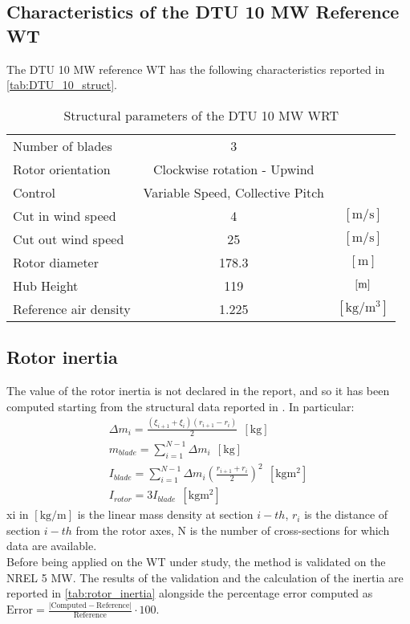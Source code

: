 \subsection{Characteristics of the DTU 10 MW Reference WT}
The DTU 10 MW reference WT has the following characteristics reported in \autoref{tab:DTU_10_struct}.
\begin{table}[htb]
    \caption{Structural parameters of the DTU 10 MW \acrshort{WRT}}
    \centering
    \begin{tabular}{lcc}
    \toprule
    Number of blades & 3 & \\
    Rotor orientation & Clockwise rotation - Upwind & \\
    Control & Variable Speed, Collective Pitch & \\
    Cut in wind speed & 4 & $\left[\si{\meter \per \second}\right]$ \\
    Cut out wind speed & 25 & $\left[\si{\meter \per \second}\right]$ \\
    Rotor diameter & 178.3 & $\left[\si{\meter}\right]$\\
    Hub Height & 119 & $\left[\si{\meter}\right]$\\
    Reference air density & 1.225 & $\left[\si{\kilo\gram\per\cubic\meter}\right]$\\
    \bottomrule
    \end{tabular}
    \label{tab:DTU_10_struct}
\end{table}

\subsection{Rotor inertia}
The value of the rotor inertia is not declared in the report, and so it has been computed starting from the structural data reported in \cite{DTU_Wind_Energy_Report-I-0092}. In particular:
\begin{gather}
    \Delta m_i=\frac{\left(\xi_{i+1} + \xi_i\right)\left(r_{i+1} - r_i\right)}{2} \ \ \left[\si{\kilo\gram}\right] \\
    m_{blade} = \sum_{i=1}^{N-1}\Delta m_i \ \ \left[\si{\kilo\gram}\right]\\
    I_{blade}=\sum_{i=1}^{N-1}\Delta m_i\left(\frac{r_{i+1} + r_i}{2}\right)^2 \ \ \left[\si{\kilo\gram\square\meter}\right]\\
    I_{rotor}=3I_{blade} \ \ \left[\si{\kilo\gram\square\meter}\right]
\end{gather}
\acrshort{xi} in $ \left[\si{\kilo\gram\per\meter}\right]$ is the linear mass density at section $i-th$, $r_i$ is the distance of section $i-th$ from the rotor axes, \acrshort{N} is the number of cross-sections for which data are available.\\
Before being applied on the \acrshort{WT} under study, the method is validated on the NREL 5 MW. The results of the validation and the calculation of the inertia are reported in \autoref{tab:rotor_inertia} alongside the percentage error computed as $\text{Error}=\frac{ |\text{Computed} - \text{Reference}| }{\text{Reference}}\cdot 100$.

